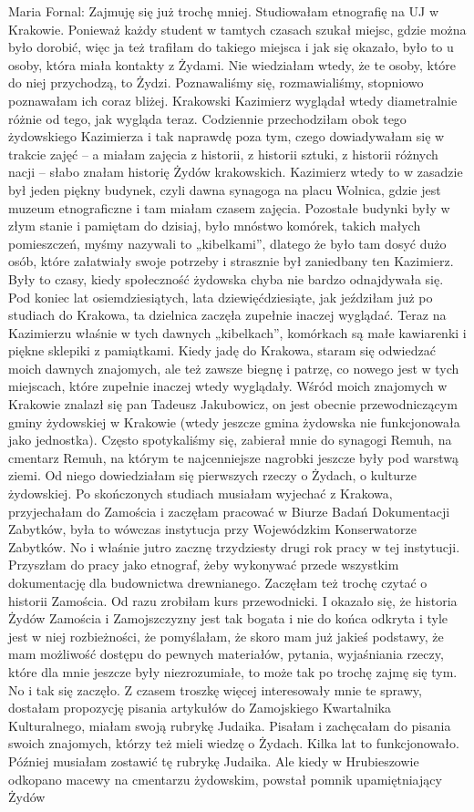 Maria Fornal: Zajmuję się już trochę mniej. Studiowałam etnografię na UJ w Krakowie. Ponieważ każdy student w tamtych czasach szukał miejsc, gdzie można było dorobić, więc ja też trafiłam do takiego miejsca i jak się okazało, było to u osoby, która miała kontakty z Żydami. Nie wiedziałam wtedy, że te osoby, które do niej przychodzą, to Żydzi. Poznawaliśmy się, rozmawialiśmy, stopniowo poznawałam ich coraz bliżej. Krakowski Kazimierz wyglądał wtedy diametralnie różnie od tego, jak wygląda teraz. Codziennie przechodziłam obok tego żydowskiego Kazimierza i tak naprawdę poza tym, czego dowiadywałam się w trakcie zajęć – a miałam zajęcia z historii, z historii sztuki, z historii różnych nacji – słabo znałam historię Żydów krakowskich. Kazimierz wtedy to w zasadzie był jeden piękny budynek, czyli dawna synagoga na placu Wolnica, gdzie jest muzeum etnograficzne i tam miałam czasem zajęcia. Pozostałe budynki były w złym stanie i pamiętam do dzisiaj, było mnóstwo komórek, takich małych pomieszczeń, myśmy nazywali to „kibelkami”, dlatego że było tam dosyć dużo osób, które załatwiały swoje potrzeby i strasznie był zaniedbany ten Kazimierz. Były to czasy, kiedy społeczność żydowska chyba nie bardzo odnajdywała się. Pod koniec lat osiemdziesiątych, lata dziewięćdziesiąte, jak jeździłam już po studiach do Krakowa, ta dzielnica zaczęła zupełnie inaczej wyglądać. Teraz na Kazimierzu właśnie w tych dawnych „kibelkach”, komórkach są małe kawiarenki i piękne sklepiki z pamiątkami. Kiedy jadę do Krakowa, staram się odwiedzać moich dawnych znajomych, ale też zawsze biegnę i patrzę, co nowego jest w tych miejscach, które zupełnie inaczej wtedy wyglądały. Wśród moich znajomych w Krakowie znalazł się pan Tadeusz Jakubowicz, on jest obecnie przewodniczącym gminy żydowskiej w Krakowie (wtedy jeszcze gmina żydowska nie funkcjonowała jako jednostka). Często spotykaliśmy się, zabierał mnie do synagogi Remuh, na cmentarz Remuh, na którym te najcenniejsze nagrobki jeszcze były pod warstwą ziemi. Od niego dowiedziałam się pierwszych rzeczy o Żydach, o kulturze żydowskiej. Po skończonych studiach musiałam wyjechać z Krakowa, przyjechałam do Zamościa i zaczęłam pracować w Biurze Badań Dokumentacji Zabytków, była to wówczas instytucja przy Wojewódzkim Konserwatorze Zabytków. No i właśnie jutro zacznę trzydziesty drugi rok pracy w tej instytucji. Przyszłam do pracy jako etnograf, żeby wykonywać przede wszystkim dokumentację dla budownictwa drewnianego. Zaczęłam też trochę czytać o historii Zamościa. Od razu zrobiłam kurs przewodnicki. I okazało się, że historia Żydów Zamościa i Zamojszczyzny jest tak bogata i nie do końca odkryta i tyle jest w niej rozbieżności, że pomyślałam, że skoro mam już jakieś podstawy, że mam możliwość dostępu do pewnych materiałów, pytania, wyjaśniania rzeczy, które dla mnie jeszcze były niezrozumiałe, to może tak po trochę zajmę się tym. No i tak się zaczęło. Z czasem troszkę więcej interesowały mnie te sprawy, dostałam propozycję pisania artykułów do Zamojskiego Kwartalnika Kulturalnego, miałam swoją rubrykę Judaika. Pisałam i zachęcałam do pisania swoich znajomych, którzy też mieli wiedzę o Żydach. Kilka lat to funkcjonowało. Później musiałam zostawić tę rubrykę Judaika. Ale kiedy w Hrubieszowie odkopano macewy na cmentarzu żydowskim, powstał pomnik upamiętniający Żydów 